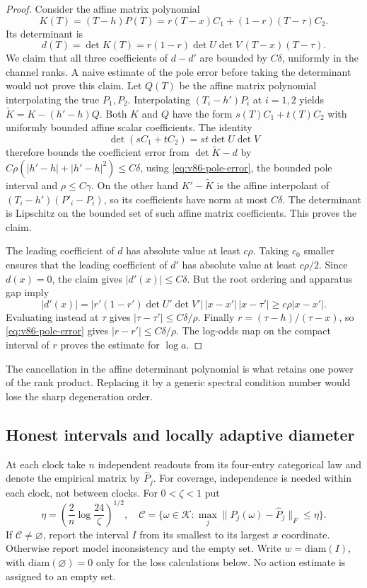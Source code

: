 \begin{proof}
Consider the affine matrix polynomial
\[
 K(T)=(T-h)P(T)=r(T-x)C_1+(1-r)(T-\tau)C_2.
\]
Its determinant is
\begin{equation}\label{eq:v86-determinant-polynomial}
 d(T)=\det K(T)=r(1-r)\det U\det V\,(T-x)(T-\tau).
\end{equation}
We claim that all three coefficients of $d-d'$ are bounded by
$C\delta$, uniformly in the channel ranks. A naive estimate of the
pole error before taking the determinant would not prove this claim.
Let $Q(T)$ be the affine matrix polynomial interpolating the true
$P_1,P_2$. Interpolating $(T_i-h')P_i$ at $i=1,2$ yields
$\widetilde K=K-(h'-h)Q$. Both $K$ and $Q$ have the form
$s(T)C_1+t(T)C_2$ with uniformly bounded affine scalar coefficients.
The identity
\[
        \det(sC_1+tC_2)=st\det U\det V
\]
therefore bounds the coefficient error from $\det\widetilde K-d$
by $C\rho(|h'-h|+|h'-h|^2)\le C\delta$, using
\eqref{eq:v86-pole-error}, the bounded pole interval and
$\rho\le C\gamma$. On the other hand $K'-\widetilde K$ is the
affine interpolant of $(T_i-h')(P'_i-P_i)$, so its coefficients have
norm at most $C\delta$. The determinant is Lipschitz on the bounded
set of such affine matrix coefficients. This proves the claim.

The leading coefficient of $d$ has absolute value at least $c\rho$.
Taking $c_0$ smaller ensures that the leading coefficient of $d'$ has
absolute value at least $c\rho/2$. Since $d(x)=0$, the claim gives
$|d'(x)|\le C\delta$. But the root ordering and apparatus gap imply
\[
 |d'(x)|=|r'(1-r')\det U'\det V'|\,
                |x-x'|\,|x-\tau'|\ge c\rho|x-x'|.
\]
Evaluating instead at $\tau$ gives
$|\tau-\tau'|\le C\delta/\rho$. Finally
$r=(\tau-h)/(\tau-x)$, so \eqref{eq:v86-pole-error} gives
$|r-r'|\le C\delta/\rho$. The log-odds map on the compact interval
of $r$ proves the estimate for $\log a$.
\end{proof}
The cancellation in the affine determinant polynomial is what retains
one power of the rank product. Replacing it by a generic spectral
condition number would lose the sharp degeneration order.

\subsection{Honest intervals and locally adaptive diameter}
At each clock take $n$ independent readouts from its four-entry
categorical law and denote the empirical matrix by $\widehat P_j$.
For coverage, independence is needed within each clock, not between
clocks. For $0<\zeta<1$ put
\begin{equation}\label{eq:v86-stat-radius}
 \eta=\left(\frac{2}{n}\log\frac{24}{\zeta}\right)^{1/2},\quad
 \mathcal C=\{\omega\in\mathcal K:
              \max_j\|P_j(\omega)-\widehat P_j\|_F\le\eta\}.
\end{equation}
If $\mathcal C\ne\varnothing$, report the interval $I$ from its
smallest to its largest $x$ coordinate. Otherwise report model
inconsistency and the empty set. Write $w=\mathrm{diam}(I)$, with
$\mathrm{diam}(\varnothing)=0$ only for the loss calculations below.
No action estimate is assigned to an empty set.

